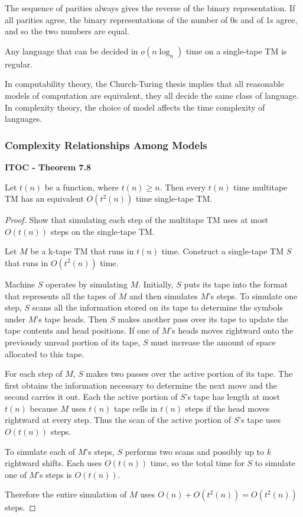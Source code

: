 The sequence of parities always gives the reverse of the binary representation. If all parities agree, the binary representations of the number of 0s and of 1s agree, and so the two numbers are equal.

{\color{blue} Any language that can be decided in $o(n\log_n)$ time on a single-tape TM is regular.}

In computability theory, the Church-Turing thesis implies that all reasonable models of computation are equivalent, they all decide the same class of language. In complexity theory, the choice of model affects the time complexity of languages.

\subsubsection{Complexity Relationships Among Models}

\begin{shaded}
\textbf{ITOC - Theorem 7.8}

\medskip
Let $t(n)$ be a function, where $t(n) \geq n$. Then every $t(n)$ time multitape TM has an equivalent $O(t^2(n))$ time single-tape TM.
\end{shaded}

\begin{mdframed}
\begin{proof}
Show that simulating each step of the multitape TM uses at most $O(t(n))$ steps on the single-tape TM. 

\medskip
Let $M$ be a k-tape TM that runs in $t(n)$ time. Construct a single-tape TM $S$ that runs in $O(t^2(n))$ time.

\medskip
Machine $S$ operates by simulating $M$. Initially, $S$ puts its tape into the format that represents all the tapes of $M$ and then simulates $M$'s steps. To simulate one step, $S$ scans all the information stored on its tape to determine the symbols under $M$'s tape heads. Then $S$ makes another pass over its tape to update the tape contents and head positions. If one of $M$'s heads moves rightward onto the previously unread portion of its tape, $S$ must increase the amount of space allocated to this tape. 

\medskip
For each step of $M$, $S$ makes two passes over the active portion of its tape. The first obtains the information necessary to determine the next move and the second carries it out. Each the active portion of $S$'s tape has length at most $t(n)$ because $M$ uses $t(n)$ tape cells in $t(n)$ steps if the head moves rightward at every step. Thus the scan of the active portion of $S$'s tape uses $O(t(n))$ steps.

\medskip
To simulate each of $M$'s steps, $S$ performs two scans and possibly up to $k$ rightward shifts. Each uses $O(t(n))$ time, so the total time for $S$ to simulate one of $M$'s steps is $O(t(n))$.

\medskip
Therefore the entire simulation of $M$ uses $O(n) + O(t^2(n)) = O(t^2(n))$ steps.
\end{proof}
\end{mdframed}


